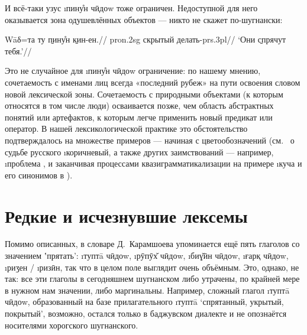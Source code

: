 И всё-таки узус \i{пину̊н чӣдоw} тоже ограничен. Недоступной для него оказывается зона одушевлённых объектов — никто не скажет по-шугнански:

\begingl
\gla \ljudge*Wāδ=та ту \b{пину̊н} \b{кин-ен}.//
 {\sc pron.2sg} скрытый делать-{\sc prs.3pl}//
 ‘Они \b{спрячут} тебя.’//
\endgl \xe

Это не случайное для \i{пину̊н чӣдоw} ограничение: по нашему мнению, сочетаемость с именами лиц всегда «последний рубеж» на пути освоения словом новой лексической зоны. Сочетаемость с природными объектами (к которым относятся в том числе люди) осваивается позже, чем область абстрактных понятий или артефактов, к которым легче применить новый предикат или оператор. В нашей лексикологической практике это обстоятельство подтверждалось на множестве примеров — начиная с цветообозначений (см.~\parencite[175–179]{rakhilina2008} о судьбе русского \i{коричневый}, а также других заимствований — например, \i{проблема} \parencite{lyashevskaya_rakhilina2010}, и заканчивая процессами квазиграмматикализации на примере \i{куча} и его синонимов в \parencite{rakhilina_sukhoen2010}).

\section{Редкие и исчезнувшие лексемы} \label{hide-rare}

Помимо описанных, в словаре Д.~Карамшоева упоминается ещё пять глаголов со значением ʽпрятать’: \i{туптā чӣдоw}, \i{рӯпӯх̌ чӣдоw}, \i{биɣ̌ӣн чӣдоw}, \i{ғарқ чӣдоw}, \i{риӡен} / \i{ризӣн}, так что в целом поле выглядит очень объёмным. Это, однако, не так: все эти глаголы в сегодняшнем шугнанском либо утрачены, по крайней мере в нужном нам значении, либо маргинальны. Например, сложный глагол \i{туптā чӣдоw}, образованный на базе прилагательного \i{туптā} ‘спрятанный, укрытый, покрытый’, возможно, остался только в баджувском диалекте и не опознаётся носителями хорогского шугнанского.


